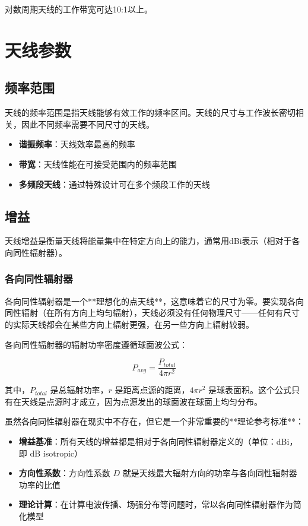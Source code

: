 对数周期天线的工作带宽可达10:1以上。

\section{天线参数}
\label{sec:antenna_parameters}

\subsection{频率范围}
\label{sec:frequency_range}

天线的频率范围是指天线能够有效工作的频率区间。天线的尺寸与工作波长密切相关，因此不同频率需要不同尺寸的天线。

\begin{itemize}
    \item \textbf{谐振频率}：天线效率最高的频率
    \item \textbf{带宽}：天线性能在可接受范围内的频率范围
    \item \textbf{多频段天线}：通过特殊设计可在多个频段工作的天线
\end{itemize}

\subsection{增益}
\label{sec:gain}

天线增益是衡量天线将能量集中在特定方向上的能力，通常用dBi表示（相对于各向同性辐射器）。

\subsubsection{各向同性辐射器}

各向同性辐射器是一个**理想化的点天线**，这意味着它的尺寸为零。要实现各向同性辐射（在所有方向上均匀辐射），天线必须没有任何物理尺寸——任何有尺寸的实际天线都会在某些方向上辐射更强，在另一些方向上辐射较弱。

各向同性辐射器的辐射功率密度遵循球面波公式：

\[ P_{avg} = \frac{P_{total}}{4\pi r^2} \]

其中，$P_{total}$ 是总辐射功率，$r$ 是距离点源的距离，$4\pi r^2$ 是球表面积。这个公式只有在天线是点源时才成立，因为点源发出的球面波在球面上均匀分布。

虽然各向同性辐射器在现实中不存在，但它是一个非常重要的**理论参考标准**：

\begin{itemize}
    \item \textbf{增益基准}：所有天线的增益都是相对于各向同性辐射器定义的（单位：dBi，即 dB isotropic）
    \item \textbf{方向性系数}：方向性系数 $D$ 就是天线最大辐射方向的功率与各向同性辐射器功率的比值
    \item \textbf{理论计算}：在计算电波传播、场强分布等问题时，常以各向同性辐射器作为简化模型
\end{itemize}

